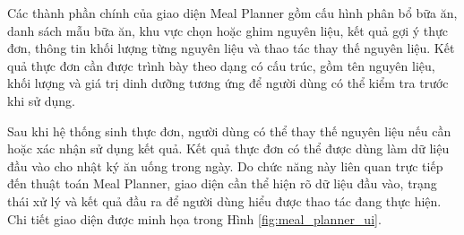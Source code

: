 \documentclass[12pt, a4paper]{report}
\begin{document}
Các thành phần chính của giao diện Meal Planner gồm cấu hình phân bổ bữa ăn, danh sách mẫu bữa ăn, khu vực chọn hoặc ghim nguyên liệu, kết quả gợi ý thực đơn, thông tin khối lượng từng nguyên liệu và thao tác thay thế nguyên liệu. Kết quả thực đơn cần được trình bày theo dạng có cấu trúc, gồm tên nguyên liệu, khối lượng và giá trị dinh dưỡng tương ứng để người dùng có thể kiểm tra trước khi sử dụng.

Sau khi hệ thống sinh thực đơn, người dùng có thể thay thế nguyên liệu nếu cần hoặc xác nhận sử dụng kết quả. Kết quả thực đơn có thể được dùng làm dữ liệu đầu vào cho nhật ký ăn uống trong ngày. Do chức năng này liên quan trực tiếp đến thuật toán Meal Planner, giao diện cần thể hiện rõ dữ liệu đầu vào, trạng thái xử lý và kết quả đầu ra để người dùng hiểu được thao tác đang thực hiện. Chi tiết giao diện được minh họa trong Hình \ref{fig:meal_planner_ui}.
\end{document}
